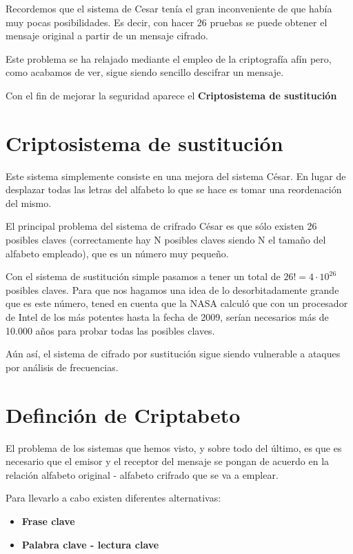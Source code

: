 Recordemos que el sistema de Cesar tenía el gran inconveniente de que había muy pocas posibilidades. Es decir, con hacer 26 pruebas se puede obtener el mensaje original a partir de un mensaje cifrado.

Este problema se ha relajado mediante el empleo de la criptografía afín pero, como acabamos de ver, sigue siendo sencillo descifrar un mensaje.

Con el fin de mejorar la seguridad aparece el \textbf{Criptosistema de sustitución}

\section{Criptosistema de sustitución}

Este sistema simplemente consiste en una mejora del sistema César. En lugar de desplazar todas las letras del alfabeto lo que se hace es tomar una reordenación del mismo.

El principal problema del sistema de crifrado César es que sólo existen 26 posibles claves (correctamente hay N posibles claves siendo N el tamaño del alfabeto empleado), que es un número muy pequeño.

Con el sistema de sustitución simple pasamos a tener un total de $26! = 4 \cdot 10^{26}$ posibles claves. Para que nos hagamos una idea de lo desorbitadamente grande que es este número, tened en cuenta que la NASA calculó que con un procesador de Intel de los más potentes hasta la fecha de 2009, serían necesarios más de 10.000 años para probar todas las posibles claves.

Aún así, el sistema de cifrado por sustitución sigue siendo vulnerable a ataques por análisis de frecuencias.

\section{Definción de Criptabeto}

El problema de los sistemas que hemos visto, y sobre todo del último, es que es necesario que el emisor y el receptor del mensaje se pongan de acuerdo en la relación alfabeto original - alfabeto crifrado que se va a emplear.

Para llevarlo a cabo existen diferentes alternativas:
\begin{itemize}
\item \textbf{Frase clave}

\item \textbf{Palabra clave - lectura clave}
\end{itemize}

